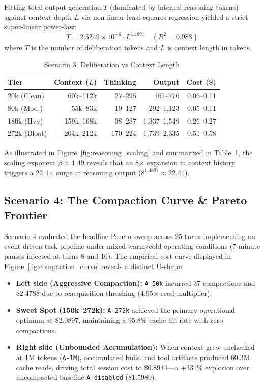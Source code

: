 \documentclass[10pt,twocolumn,a4paper]{article}
\begin{document}
Fitting total output generation $T$ (dominated by internal reasoning tokens) against context depth $L$ via non-linear least squares regression yielded a strict super-linear power-law:
\begin{equation}
T = 2.5249 \times 10^{-6} \cdot L^{1.4897} \quad (R^2 = 0.988)
\end{equation}
where $T$ is the number of deliberation tokens and $L$ is context length in tokens.

\begin{table}[t]
\caption{Scenario 3: Deliberation vs Context Length}
\label{tab:scenario3}
\centering
\footnotesize
\setlength{\tabcolsep}{2.5pt}
\begin{tabular}{@{}lrrrr@{}}
\toprule
\textbf{Tier} & \textbf{Context ($L$)} & \textbf{Thinking} & \textbf{Output} & \textbf{Cost (\$)} \\
\midrule
20k (Clean) & 60k--112k & 27--295 & 467--776 & 0.06--0.11 \\
80k (Mod.) & 55k--83k & 19--127 & 292--1,123 & 0.05--0.11 \\
180k (Hvy) & 159k--168k & 38--287 & 1,337--1,549 & 0.26--0.27 \\
272k (Bloat) & 204k--212k & 170--224 & 1,739--2,335 & 0.51--0.58 \\
\bottomrule
\end{tabular}
\end{table}

As illustrated in Figure~\ref{fig:reasoning_scaling} and summarized in Table~\ref{tab:scenario3}, the scaling exponent $\beta \approx 1.49$ reveals that an 8$\times$ expansion in context history triggers a 22.4$\times$ surge in reasoning output ($8^{1.4897} \approx 22.41$).

\subsection{Scenario 4: The Compaction Curve \& Pareto Frontier}
Scenario 4 evaluated the headline Pareto sweep across 25 turns implementing an event-driven task pipeline under mixed warm/cold operating conditions (7-minute pauses injected at turns 8 and 16). The empirical cost curve displayed in Figure~\ref{fig:compaction_curve} reveals a distinct U-shape:
\begin{itemize}
  \item \textbf{Left side (Aggressive Compaction):} \texttt{A-50k} incurred 37 compactions and \$2.4788 due to reacquisition thrashing (4.95$\times$ read multiplier).
  \item \textbf{Sweet Spot (150k--272k):} \texttt{A-272k} achieved the primary operational optimum at \$2.0897, maintaining a 95.8\% cache hit rate with zero compactions.
  \item \textbf{Right side (Unbounded Accumulation):} When context grew unchecked at 1M tokens (\texttt{A-1M}), accumulated build and tool artifacts produced 60.3M cache reads, driving total session cost to \$6.8944—a +331\% explosion over uncompacted baseline \texttt{A-disabled} (\$1.5980).
\end{itemize}
\end{document}

